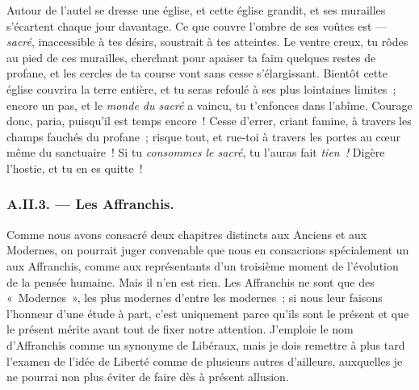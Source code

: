 \documentclass[french,twoside]{book} %
\begin{document}
Autour de l’autel se dresse une église, et cette église grandit, et ses murailles s’écartent chaque jour davantage. Ce que couvre l’ombre de ses voûtes est — \emph{sacré}, inaccessible à tes désirs, soustrait à tes atteintes. Le ventre creux, tu rôdes au pied de ces murailles, cherchant pour apaiser ta faim quelques restes de profane, et les cercles de ta course vont sans cesse s’élargissant. Bientôt cette église couvrira la terre entière, et tu seras refoulé à ses plus lointaines limites ; encore un pas, et le \emph{monde du sacré} a vaincu, tu t’enfonces dans l’abîme. Courage donc, paria, puisqu’il est temps encore ! Cesse d’errer, criant famine, à travers les champs fauchés du profane ; risque tout, et rue-toi à travers les portes au cœur même du sanctuaire ! Si tu \emph{consommes le sacré}, tu l’auras fait \emph{tien ! }Digère l’hostie, et tu en es quitte !
\subsubsection[{A.II.3. — Les Affranchis.}]{A.II.3. — Les Affranchis.}
\noindent Comme nous avons consacré deux chapitres distincts aux Anciens et aux Modernes, on pourrait juger convenable que nous en consacrions spécialement un aux Affranchis, comme aux représentants d’un troisième moment de l’évolution de la pensée humaine.  Mais il n’en est rien. Les Affranchis ne sont que des « Modernes », les plus modernes d’entre les modernes ; si nous leur faisons l’honneur d’une étude à part, c’est uniquement parce qu’ils sont le présent et que le présent mérite avant tout de fixer notre attention. J’emploie le nom d’Affranchis comme un synonyme de Libéraux, mais je dois remettre à plus tard l’examen de l’idée de Liberté comme de plusieurs autres d’ailleurs, auxquelles je ne pourrai non plus éviter de faire dès à présent allusion.\par
\end{document}
